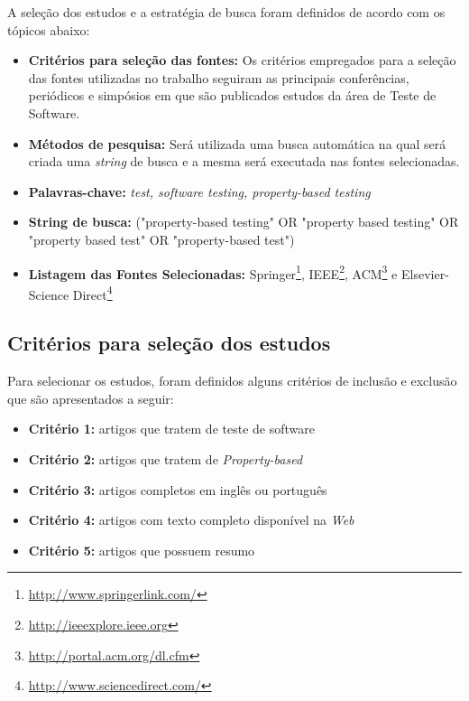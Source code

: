 A seleção dos estudos e a estratégia de busca foram definidos de acordo com os tópicos abaixo: 

\begin{itemize}
    \item \textbf{Critérios para seleção das fontes:} Os critérios empregados para a seleção das fontes utilizadas no trabalho seguiram as principais conferências, periódicos e simpósios em que são publicados estudos da área de Teste de Software.
    
    
    \item \textbf{Métodos de pesquisa:} Será utilizada uma busca automática na qual será criada uma \textit{string} de busca e a mesma será executada nas fontes selecionadas.
    
    
    \item \textbf{Palavras-chave:} \textit{test, software testing, property-based testing}
    
    
    \item \textbf{String de busca:} ("property-based testing" OR "property based testing" OR "property based test" OR "property-based test") 
    
    
    \item \textbf{Listagem das Fontes Selecionadas:} Springer\footnote{\url{http://www.springerlink.com/}}, IEEE\footnote{\url{http://ieeexplore.ieee.org}}, ACM\footnote{\url{http://portal.acm.org/dl.cfm}} e Elsevier-Science Direct\footnote{\url{http://www.sciencedirect.com/}}
\end{itemize}

\subsection{Critérios para seleção dos estudos}

Para selecionar os estudos, foram definidos alguns critérios de inclusão e exclusão que são apresentados a seguir:

\begin{itemize}
    \item \textbf{Critério 1:} artigos que tratem de teste de software
    
    
    
    \item \textbf{Critério 2:} artigos que tratem de \textit{Property-based}
    
    
    \item \textbf{Critério 3:} artigos completos em inglês ou português
    
    
    \item \textbf{Critério 4:} artigos com texto completo disponível na \textit{Web}
    
    
    \item \textbf{Critério 5:} artigos que possuem resumo
\end{itemize}


